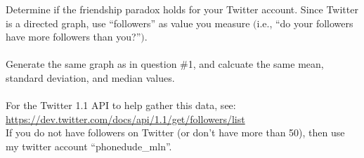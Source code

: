 Determine if the friendship paradox holds for your Twitter account.
Since Twitter is a directed graph, use \enquote{followers} as value you measure 
$($i.e., \enquote{do your followers have more followers than you?}$)$.\\
\\
Generate the same graph as in question \#1, and calcuate the same 
mean, standard deviation, and median values.\\
\\
For the Twitter 1.1 API to help gather this data, see:
\\
\url{https://dev.twitter.com/docs/api/1.1/get/followers/list}
\\
If you do not have followers on Twitter (or don't have more than 50),
then use my twitter account \enquote{phonedude\_mln}.